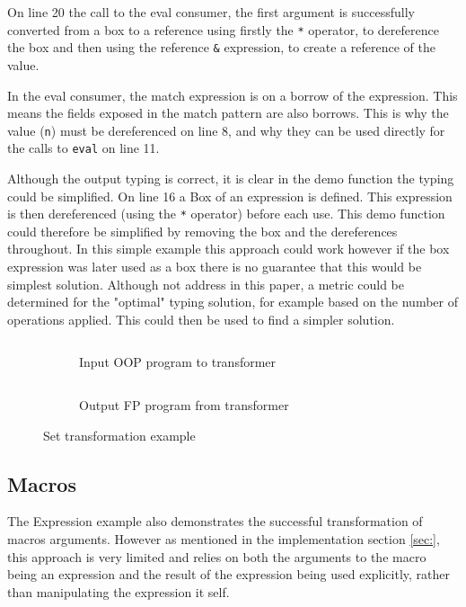 \documentclass[ oneside,%
                    author={James Elgar},
                    degree={MEng},
                     title={Bidirectional transformer between functional and \\ object-oriented programming in Rust},
                  subtitle={}]{dissertation}
\newcommand{\rust}[1]{\texttt{#1}}
\newcommand{\codefile}[2]{\inputminted[xleftmargin=20pt,linenos, breaklines]{#1}{#2}}
\newcommand{\rustfile}[1]{\codefile{rust}{../#1.rs}}
\newcommand{\rustexample}[1]{\rustfile{examples/src/#1}}
\newcommand{\rustoutput}[1]{\rustfile{outputs/src/#1}}
\begin{document}
On line 20 the call to the eval consumer, the first argument is successfully converted from a box to a reference using firstly the \rust{*} operator, to dereference the box and then using the reference \rust{&} expression, to create a reference of the value.

In the eval consumer, the match expression is on a borrow of the expression. This means the fields exposed in the match pattern are also borrows. This is why the value (\rust{n}) must be dereferenced on line 8, and why they can be used directly for the calls to \rust{eval} on line 11.

Although the output typing is correct, it is clear in the demo function the typing could be simplified. On line 16 a Box of an expression is defined. This expression is then dereferenced (using the \rust{*} operator) before each use. This demo function could therefore be simplified by removing the box and the dereferences throughout. In this simple example this approach could work however if the box expression was later used as a box there is no guarantee that this would be simplest solution. Although not address in this paper, a metric could be determined for the "optimal" typing solution, for example based on the number of operations applied. This could then be used to find a simpler solution.


\begin{figure}
\centering
\begin{subfigure}{.5\textwidth}
    \rustexample{exp/oop}
    \caption{Input OOP program to transformer}
    \label{fig:trans-set-ex-input}
\end{subfigure}%
\begin{subfigure}{.5\textwidth}
    \rustoutput{exp/oop}
    \caption{Output FP program from transformer}
    \label{fig:trans-set-ex-output}
\end{subfigure}
\caption{Set transformation example}
\label{fig:trans-set-ex}
\end{figure}

\subsection{Macros}

The Expression example also demonstrates the successful transformation of macros arguments. However as mentioned in the implementation section \autoref{sec:}, this approach is very limited and relies on both the arguments to the macro being an expression and the result of the expression being used explicitly, rather than manipulating the expression it self.
\end{document}
